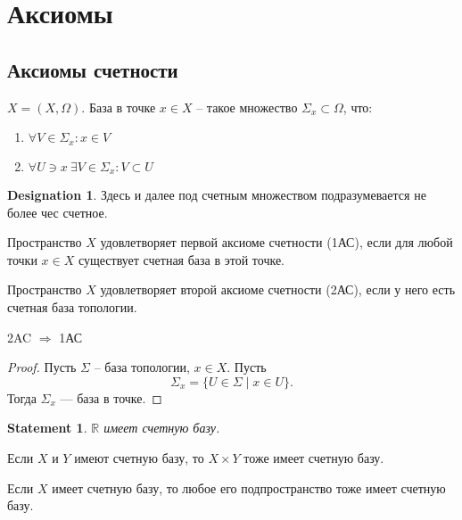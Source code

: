 \documentclass[11pt]{book}
\newcommand{\R}{\mathbb{R}}
\theoremstyle{definition}
\theoremstyle{plain}
\theoremstyle{plain}
\newtheorem*{st}{Statement}
\theoremstyle{definition}
\newtheorem*{name}{Designation}
\theoremstyle{remark}
\begin{document}
\section{Аксиомы}
\subsection{Аксиомы счетности}
\begin{defn}
    $ X = (X , \Omega )$.
    {\sf База в точке} $ x \in  X$ -- такое множество $ \Sigma _x \subset \Omega $, что:
    \begin{enumerate}
	\item $ \forall V \in  \Sigma _x: x \in  V$
	\item $ \forall U \ni x~ \exists V \in  \Sigma _x: V \subset U$
    \end{enumerate}
\end{defn}
\begin{name}
    Здесь и далее под счетным множеством подразумевается не более чес счетное.
\end{name}
\begin{defn}
    Пространство $ X$ удовлетворяет {\sf первой аксиоме счетности (1АС)}, если для любой точки $ x \in  X$ существует счетная база в этой точке.
\end{defn}
\begin{defn}
Пространство $ X$ удовлетворяет {\sf второй аксиоме счетности (2АС)}, если у него есть счетная база топологии.
\end{defn}
\begin{thm}
    2AC  $ \Rightarrow $ 1АС
\end{thm}
\begin{proof}
    Пусть $  \Sigma  $ -- база топологии, $ x \in X$. Пусть
    \[
	\Sigma_x = \{U \in  \Sigma \mid x \in  U\}
    .\]
    Тогда $ \Sigma_x$ ---  база в точке.
\end{proof}
\begin{st}
    $ \R$ имеет счетную базу.
\end{st}
\begin{thm}
    Если $ X$ и $ Y$ имеют счетную базу, то $ X \times  Y$ тоже имеет счетную базу.
\end{thm}
\begin{thm}
    Если $ X$ имеет счетную базу, то любое его подпространство тоже имеет счетную базу.
\end{thm}
\end{document}
